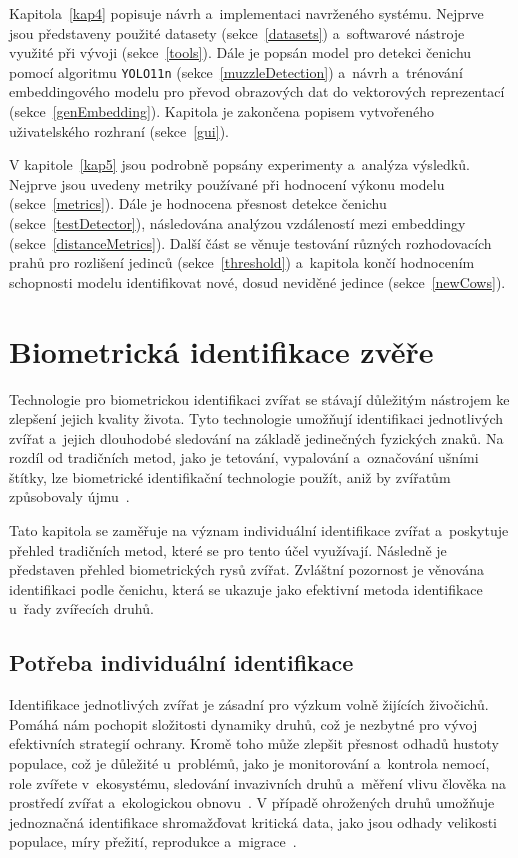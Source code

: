 Kapitola~\ref{kap4} popisuje návrh a~implementaci navrženého systému. Nejprve jsou představeny použité datasety (sekce~\ref{datasets}) a~softwarové nástroje využité při vývoji (sekce~\ref{tools}).
Dále je popsán model pro detekci čenichu pomocí algoritmu \texttt{YOLO11n} (sekce~\ref{muzzleDetection}) a~návrh a~trénování embeddingového modelu pro převod obrazových dat do vektorových reprezentací (sekce~\ref{genEmbedding}). Kapitola je zakončena popisem vytvořeného uživatelského rozhraní (sekce~\ref{gui}).

V kapitole~\ref{kap5} jsou podrobně popsány experimenty a~analýza výsledků. Nejprve jsou uvedeny metriky používané při hodnocení výkonu modelu (sekce~\ref{metrics}). Dále je hodnocena přesnost detekce čenichu (sekce~\ref{testDetector}), následována analýzou vzdáleností mezi embeddingy (sekce~\ref{distanceMetrics}). Další část se věnuje testování různých rozhodovacích prahů pro rozlišení jedinců (sekce~\ref{threshold}) a~kapitola končí hodnocením schopnosti modelu identifikovat nové, dosud neviděné jedince (sekce~\ref{newCows}).

\chapter{Biometrická identifikace zvěře}
\label{kap2}
Technologie pro biometrickou identifikaci zvířat se stávají důležitým nástrojem ke zlepšení jejich kvality života. Tyto technologie umožňují identifikaci jednotlivých zvířat a~jejich dlouhodobé sledování na základě jedinečných fyzických znaků. Na rozdíl od tradičních metod, jako je tetování, vypalování a~označování ušními štítky, lze biometrické identifikační technologie použít, aniž by zvířatům způsobovaly újmu~\cite{Cihan}.

Tato kapitola se zaměřuje na význam individuální identifikace zvířat a~poskytuje přehled tradičních metod, které se pro tento účel využívají. Následně je představen přehled biometrických rysů zvířat. Zvláštní pozornost je věnována identifikaci podle čenichu, která se ukazuje jako efektivní metoda identifikace u~řady zvířecích druhů.

\section{Potřeba individuální identifikace}
\label{potřeby}
Identifikace jednotlivých zvířat je zásadní pro výzkum volně žijících živočichů. Pomáhá nám pochopit složitosti dynamiky druhů, což je nezbytné pro vývoj efektivních strategií ochrany. Kromě toho může zlepšit přesnost odhadů hustoty populace, což je důležité u~problémů, jako je monitorování a~kontrola nemocí, role zvířete v~ekosystému, sledování invazivních druhů a~měření vlivu člověka na prostředí zvířat a~ekologickou obnovu~\cite{WildFusion}.
V případě ohrožených druhů umožňuje jednoznačná identifikace shromažďovat kritická data, jako jsou odhady velikosti populace, míry přežití, reprodukce a~migrace~\cite{polar}.

